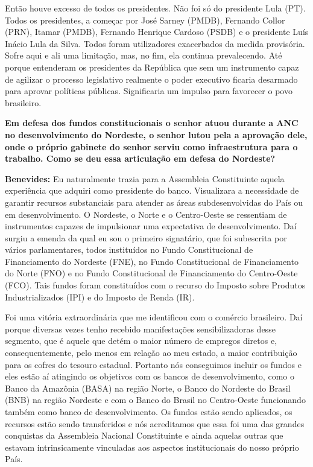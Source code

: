 Então houve excesso de todos os presidentes. Não foi só do presidente
Lula (PT). Todos os presidentes, a começar por José Sarney (PMDB),
Fernando Collor (PRN), Itamar (PMDB), Fernando Henrique Cardoso (PSDB) e
o presidente Luís Inácio Lula da Silva. Todos foram utilizadores
exacerbados da medida provisória. Sofre aqui e ali uma limitação, mas,
no fim, ela continua prevalecendo. Até porque entenderam os presidentes
da República que sem um instrumento capaz de agilizar o processo
legislativo realmente o poder executivo ficaria desarmado para aprovar
políticas públicas. Significaria um impulso para favorecer o povo
brasileiro.

\textbf{Em defesa dos fundos constitucionais o senhor atuou durante a
ANC no desenvolvimento do Nordeste, o senhor lutou pela a aprovação
dele, onde o próprio gabinete do senhor serviu como infraestrutura para
o trabalho. Como se deu essa articulação em defesa do Nordeste?}

\textbf{Benevides:} Eu naturalmente trazia para a Assembleia
Constituinte aquela experiência que adquiri como presidente do banco.
Visualizara a necessidade de garantir recursos substanciais para atender
as áreas subdesenvolvidas do País ou em desenvolvimento. O Nordeste, o
Norte e o Centro-Oeste se ressentiam de instrumentos capazes de
impulsionar uma expectativa de desenvolvimento. Daí surgiu a emenda da
qual eu sou o primeiro signatário, que foi subescrita por vários
parlamentares, todos instituídos no Fundo Constitucional de
Financiamento do Nordeste (FNE), no Fundo Constitucional de
Financiamento do Norte (FNO) e no Fundo Constitucional de Financiamento
do Centro-Oeste (FCO). Tais fundos foram constituídos com o recurso do
Imposto sobre Produtos Industrializados (IPI) e do Imposto de Renda
(IR).

Foi uma vitória extraordinária que me identificou com o comércio
brasileiro. Daí porque diversas vezes tenho recebido manifestações
sensibilizadoras desse segmento, que é aquele que detém o maior número
de empregos diretos e, consequentemente, pelo menos em relação ao meu
estado, a maior contribuição para os cofres do tesouro estadual.
Portanto nós conseguimos incluir os fundos e eles estão aí atingindo os
objetivos com os bancos de desenvolvimento, como o Banco da Amazônia
(BASA) na região Norte, o Banco do Nordeste do Brasil (BNB) na região
Nordeste e com o Banco do Brasil no Centro-Oeste funcionando também como
banco de desenvolvimento. Os fundos estão sendo aplicados, os recursos
estão sendo transferidos e nós acreditamos que essa foi uma das grandes
conquistas da Assembleia Nacional Constituinte e ainda aquelas outras
que estavam intrinsicamente vinculadas aos aspectos institucionais do
nosso próprio País.

